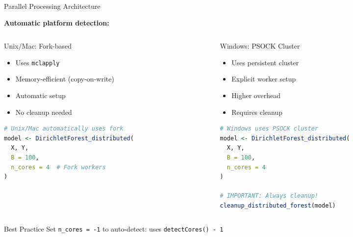 \documentclass[aspectratio=169]{beamer}
\begin{document}
\begin{frame}[fragile]{Parallel Processing Architecture}

\textbf{Automatic platform detection:}

\vspace{0.3cm}

\begin{columns}[T]

\begin{column}{0.48\textwidth}
\begin{block}{Unix/Mac: Fork-based}
\end{block}

\begin{itemize}
\item Uses \texttt{mclapply}
\item Memory-efficient (copy-on-write)
\item Automatic setup
\item No cleanup needed
\end{itemize}

\vspace{0.2cm}

\begin{lstlisting}[language=R, basicstyle=\tiny\ttfamily]
# Unix/Mac automatically uses fork
model <- DirichletForest_distributed(
  X, Y, 
  B = 100,
  n_cores = 4  # Fork workers
)
\end{lstlisting}

\end{column}

\begin{column}{0.48\textwidth}
\begin{block}{Windows: PSOCK Cluster}
\end{block}

\begin{itemize}
\item Uses persistent cluster
\item Explicit worker setup
\item Higher overhead
\item Requires cleanup
\end{itemize}

\vspace{0.2cm}

\begin{lstlisting}[language=R, basicstyle=\tiny\ttfamily]
# Windows uses PSOCK cluster
model <- DirichletForest_distributed(
  X, Y, 
  B = 100,
  n_cores = 4
)

# IMPORTANT: Always cleanup!
cleanup_distributed_forest(model)
\end{lstlisting}

\end{column}

\end{columns}

\vspace{0.3cm}

\begin{alertblock}{Best Practice}
Set \texttt{n\_cores = -1} to auto-detect: uses \texttt{detectCores() - 1}
\end{alertblock}

\end{frame}
\end{document}
